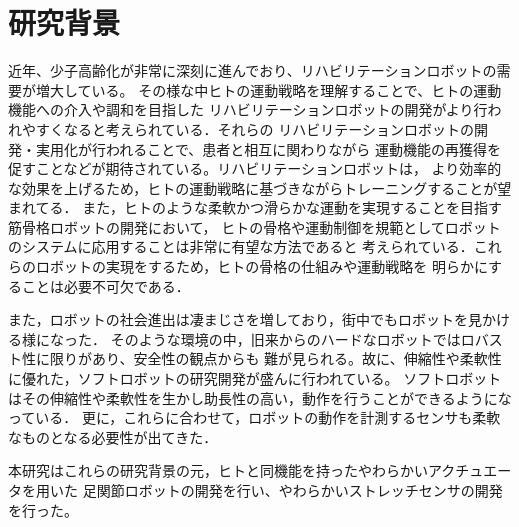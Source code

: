 \section{研究背景}

近年、少子高齢化が非常に深刻に進んでおり、リハビリテーションロボットの需要が増大している。
その様な中ヒトの運動戦略を理解することで、ヒトの運動機能への介入や調和を目指した
リハビリテーションロボットの開発がより行われやすくなると考えられている．それらの
リハビリテーションロボットの開発・実用化が行われることで、患者と相互に関わりながら
運動機能の再獲得を促すことなどが期待されている。リハビリテーションロボットは，
より効率的な効果を上げるため，ヒトの運動戦略に基づきながらトレーニングすることが望まれてる．
また，ヒトのような柔軟かつ滑らかな運動を実現することを目指す筋骨格ロボットの開発において，
ヒトの骨格や運動制御を規範としてロボットのシステムに応用することは非常に有望な方法であると
考えられている．これらのロボットの実現をするため，ヒトの骨格の仕組みや運動戦略を
明らかにすることは必要不可欠である．

また，ロボットの社会進出は凄まじさを増しており，街中でもロボットを見かける様になった．
そのような環境の中，旧来からのハードなロボットではロバスト性に限りがあり、安全性の観点からも
難が見られる。故に、伸縮性や柔軟性に優れた，ソフトロボットの研究開発が盛んに行われている。
ソフトロボットはその伸縮性や柔軟性を生かし助長性の高い，動作を行うことができるようになっている．
更に，これらに合わせて，ロボットの動作を計測するセンサも柔軟なものとなる必要性が出てきた．

本研究はこれらの研究背景の元，ヒトと同機能を持ったやわらかいアクチュエータを用いた
足関節ロボットの開発を行い、やわらかいストレッチセンサの開発を行った。

